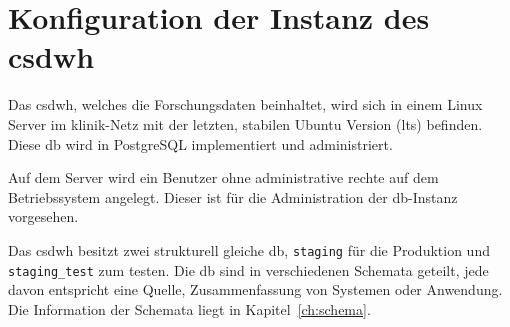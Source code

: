 \chapter{Konfiguration der Instanz des \acs{csdwh}}
    
    Das \ac{csdwh}, welches die Forschungsdaten beinhaltet, wird sich in einem Linux Server im klinik-Netz mit der letzten, stabilen Ubuntu Version (\ac{lts}) befinden. Diese \ac{db} wird in PostgreSQL implementiert und administriert.  
    
    Auf dem Server wird ein Benutzer ohne administrative rechte auf dem Betriebssystem angelegt. Dieser ist für die Administration der \ac{db}-Instanz vorgesehen.
    
    Das \ac{csdwh} besitzt zwei strukturell gleiche \ac{db}, \texttt{staging} für die Produktion und \texttt{staging\_test} zum testen. Die \ac{db} sind in verschiedenen Schemata geteilt, jede davon entspricht eine Quelle, Zusammenfassung von Systemen oder Anwendung. Die Information der Schemata liegt in Kapitel~\ref{ch:schema}.